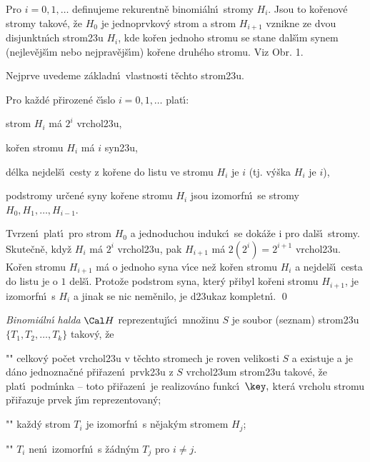 \documentclass[a4paper,12pt]{article}
\begin{document}
\flushpar Pro $i=0,1,\dots$ definujeme rekurentn\v e binomi\'aln\'\i\ 
stromy $H_i$.  Jsou to ko\v renov\'e stromy takov\'e, \v ze $H_0$ je 
jednoprvkov\'y strom a  strom $H_{i+1}$ vznikne ze dvou 
disjunktn\'\i ch strom\accent23u $H_i$, kde ko\v ren jednoho stromu  
se stane dal\v s\'\i m synem (nejlev\v ej\v s\'\i m nebo nejprav\v ej\v s\'\i m) ko\v rene druh\'eho stromu.  Viz 
Obr.  1. 
\medskip

\midinsert
\centerline{}
\endcaption
\endinsert

\flushpar Nejprve uvedeme z\'akladn\'\i\ vlastnosti t\v echto 
strom\accent23u.
\medskip

Pro ka\v zd\'e p\v rirozen\'e \v c\'\i slo $
i=0,1,\dots$ 
plat\'\i :
\roster
\item
strom $H_i$ m\'a $2^i$ vrchol\accent23u,
\item
ko\v ren stromu $H_i$ m\'a $i$ syn\accent23u,
\item
d\'elka nejdel\v s\'\i\ cesty z ko\v rene do listu ve stromu $H_i$ je 
$i$ (tj. v\'y\v ska $H_i$ je $i$),
\item
podstromy ur\v cen\'e syny ko\v rene stromu $H_i$ jsou izomorf\-n\'\i\ 
se stromy $H_0,H_1,\dots,H_{i-1}$.
\endroster
\endproclaim

Tvrzen\'\i\ plat\'\i\ pro strom $H_0$ a 
jednoduchou indukc\'\i\ se dok\'a\v ze i pro dal\v s\'\i\ stromy. 
Skute\v cn\v e, kdy\v z $H_i$ m\'a $2^i$ vrchol\accent23u, pak $H_{
i+1}$ m\'a 
$2(2^i)=2^{i+1}$ vrchol\accent23u. Ko\v ren stromu $H_{i+1}$ m\'a o jednoho 
syna v\'\i ce ne\v z ko\v ren stromu $H_i$ a nejdel\v s\'\i\ cesta do listu je o $
1$ 
del\v s\'\i . Proto\v ze podstrom syna, kter\'y p\v ribyl ko\v reni stromu 
$H_{i+1}$, je izomorfn\'\i\ s $H_i$ a jinak se nic nem\v enilo, je 
d\accent23ukaz kompletn\'\i . \qed
\enddemo
\medskip

\flushpar\emph{Binomi\'aln\'\i} \emph{halda} $\Cal H$ reprezentuj\'\i c\'\i\ 
mno\v zinu $S$ je soubor (seznam) strom\accent23u $\{T_1,T_2,\dots
,T_k\}$ 
takov\'y, \v ze 
\roster
\item"{}"
celkov\'y po\v cet vrchol\accent23u v t\v echto stromech je 
roven velikosti $S$ a 
existuje a je d\'ano jednozna\v cn\'e p\v ri\v razen\'\i\ prvk\accent23u 
z $S$ vrchol\accent23um strom\accent23u takov\'e, \v ze plat\'\i\ 
podm\'\i nka  -- toto p\v ri\v razen\'\i\ je realizov\'ano 
funkc\'\i\ 
$\key,$ kter\'a vrcholu stromu p\v ri\v razuje prvek j\'\i m reprezentovan\'y;
\item"{}"
ka\v zd\'y strom $T_i$ je izomorfn\'\i\ s n\v ejak\'ym stromem $H_
j$;
\item"{}"
$T_i$ nen\'\i\ izomorfn\'\i\ s \v z\'adn\'ym $T_j$ pro $i\ne j$.
\endroster
\medskip
\end{document}
